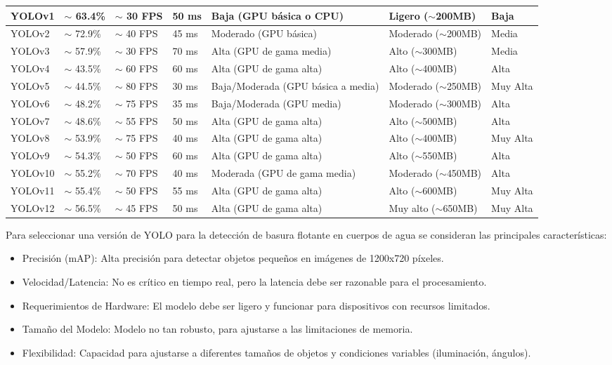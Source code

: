 \begin{longtable}{|p{1.8cm}|p{2cm}|p{2cm}|p{1.8cm}|p{3cm}|p{2cm}|p{2.3cm}|}
YOLOv1 & $\sim$ 63.4\% & $\sim$ 30 FPS & 50 ms & Baja (GPU básica o CPU) & Ligero ($\sim$200MB) & Baja \\ \hline
YOLOv2 & $\sim$ 72.9\% & $\sim$ 40 FPS & 45 ms & Moderado (GPU básica) & Moderado ($\sim$200MB) & Media \\ \hline
YOLOv3 & $\sim$ 57.9\% & $\sim$ 30 FPS & 70 ms & Alta (GPU de gama media) & Alto ($\sim$300MB) & Media \\ \hline
YOLOv4 & $\sim$ 43.5\% & $\sim$ 60 FPS & 60 ms & Alta (GPU de gama alta) & Alto ($\sim$400MB) & Alta \\ \hline
YOLOv5 & $\sim$ 44.5\% & $\sim$ 80 FPS & 30 ms & Baja/Moderada (GPU básica a media) & Moderado ($\sim$250MB) & Muy Alta \\ \hline
YOLOv6 & $\sim$ 48.2\% & $\sim$ 75 FPS & 35 ms & Baja/Moderada (GPU media) & Moderado ($\sim$300MB) & Alta \\ \hline
YOLOv7 & $\sim$ 48.6\% & $\sim$ 55 FPS & 50 ms & Alta (GPU de gama alta) & Alto ($\sim$500MB) & Alta \\ \hline
YOLOv8 & $\sim$ 53.9\% & $\sim$ 75 FPS & 40 ms & Alta (GPU de gama alta) & Alto ($\sim$400MB) & Muy Alta \\ \hline
YOLOv9 & $\sim$ 54.3\% & $\sim$ 50 FPS & 60 ms & Alta (GPU de gama alta) & Alto ($\sim$550MB) & Alta \\ \hline
YOLOv10 & $\sim$ 55.2\% & $\sim$ 70 FPS & 40 ms & Moderada (GPU de gama media) & Moderado ($\sim$450MB) & Alta \\ \hline
YOLOv11 & $\sim$ 55.4\% & $\sim$ 50 FPS & 55 ms & Alta (GPU de gama alta) & Alto ($\sim$600MB) & Muy Alta \\ \hline
YOLOv12 & $\sim$ 56.5\% & $\sim$ 45 FPS & 50 ms & Alta (GPU de gama alta) & Muy alto ($\sim$650MB) & Muy Alta \\ \hline

\end{longtable}



Para seleccionar una versión de YOLO para la detección de basura flotante en cuerpos de agua se consideran las principales características:

\begin{itemize}
    \item Precisión (mAP): Alta precisión para detectar objetos pequeños en imágenes de 1200x720 píxeles.
    \item Velocidad/Latencia: No es crítico en tiempo real, pero la latencia debe ser razonable para el procesamiento.
    \item Requerimientos de Hardware: El modelo debe ser ligero y funcionar para dispositivos con recursos limitados.
    \item Tamaño del Modelo: Modelo no tan robusto, para ajustarse a las limitaciones de memoria.
    \item Flexibilidad: Capacidad para ajustarse a diferentes tamaños de objetos y condiciones variables (iluminación, ángulos).
\end{itemize}

